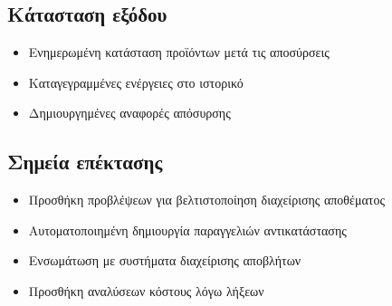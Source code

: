 \documentclass[12pt,a4paper,twoside]{book}
\begin{document}
\subsection{Κάτασταση εξόδου}
\begin{itemize}
  \item Ενημερωμένη κατάσταση προϊόντων μετά τις αποσύρσεις
  \item Καταγεγραμμένες ενέργειες στο ιστορικό
  \item Δημιουργημένες αναφορές απόσυρσης
\end{itemize}

\subsection{Σημεία επέκτασης}
\begin{itemize}
  \item Προσθήκη προβλέψεων για βελτιστοποίηση διαχείρισης αποθέματος
  \item Αυτοματοποιημένη δημιουργία παραγγελιών αντικατάστασης
  \item Ενσωμάτωση με συστήματα διαχείρισης αποβλήτων
  \item Προσθήκη αναλύσεων κόστους λόγω λήξεων
\end{itemize}
\end{document}
